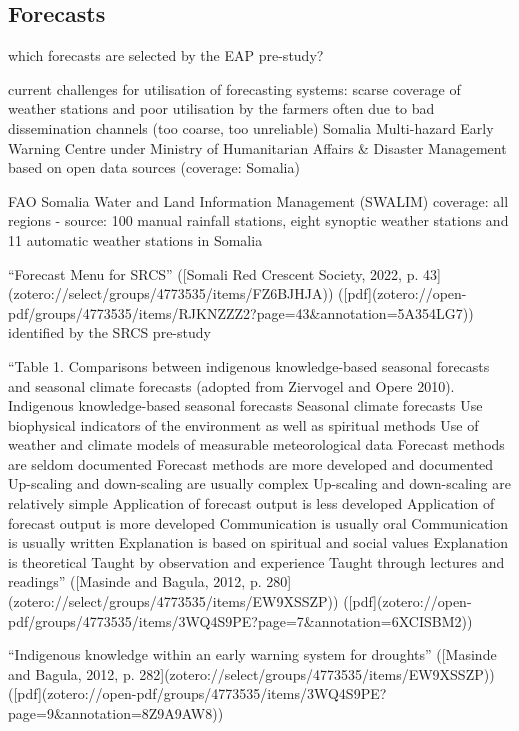 {%

\subsection{Forecasts}
which forecasts are selected by the EAP pre-study?

current challenges for utilisation of forecasting systems: scarse coverage of weather stations and poor utilisation by the farmers often due to bad dissemination channels  (too coarse, too unreliable)
Somalia Multi-hazard Early Warning Centre under Ministry of Humanitarian Affairs & Disaster Management
based on open data sources (coverage: Somalia)

FAO Somalia Water and Land Information Management (SWALIM) coverage: all regions - source: 100 manual rainfall stations, eight synoptic weather stations and 11 automatic weather stations in Somalia

“Forecast Menu for SRCS” ([Somali Red Crescent Society, 2022, p. 43](zotero://select/groups/4773535/items/FZ6BJHJA)) ([pdf](zotero://open-pdf/groups/4773535/items/RJKNZZZ2?page=43&annotation=5A354LG7))
identified by the SRCS pre-study

“Table 1. Comparisons between indigenous knowledge-based seasonal forecasts and seasonal climate forecasts (adopted from Ziervogel and Opere 2010). Indigenous knowledge-based seasonal forecasts Seasonal climate forecasts Use biophysical indicators of the environment as well as spiritual methods Use of weather and climate models of measurable meteorological data Forecast methods are seldom documented Forecast methods are more developed and documented Up-scaling and down-scaling are usually complex Up-scaling and down-scaling are relatively simple Application of forecast output is less developed Application of forecast output is more developed Communication is usually oral Communication is usually written Explanation is based on spiritual and social values Explanation is theoretical Taught by observation and experience Taught through lectures and readings” ([Masinde and Bagula, 2012, p. 280](zotero://select/groups/4773535/items/EW9XSSZP)) ([pdf](zotero://open-pdf/groups/4773535/items/3WQ4S9PE?page=7&annotation=6XCISBM2))

“Indigenous knowledge within an early warning system for droughts” ([Masinde and Bagula, 2012, p. 282](zotero://select/groups/4773535/items/EW9XSSZP)) ([pdf](zotero://open-pdf/groups/4773535/items/3WQ4S9PE?page=9&annotation=8Z9A9AW8))

}
